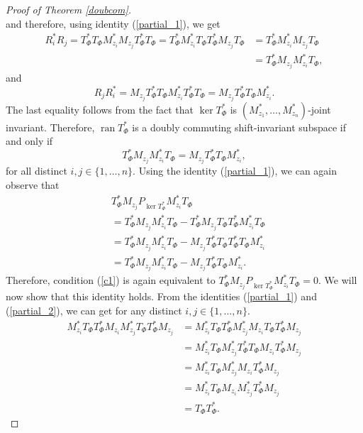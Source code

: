 \documentclass[12pt]{amsart}
\theoremstyle{definition}
\DeclareMathOperator{\ran}{ran}
\newcommand{\1}{{\mbox{\bf 1}}}
\begin{document}
\begin{proof}[Proof of Theorem \ref{doubcom}]
\begin{equation}
\end{equation}
and therefore, using identity (\ref{partial_1}), we get
\begin{align*}
R_i^* R_j = T_{\Phi}^* T_{\Phi} M_{z_i}^* M_{z_j}  T_{\Phi}^* T_{\Phi} = T_{\Phi}^* M_{z_i}^* T_{\Phi} T_{\Phi}^* M_{z_j} T_{\Phi}  &= T_{\Phi}^* M_{z_i}^* M_{z_j} T_{\Phi}  \\
&= T_{\Phi}^* M_{z_j}  M_{z_i}^*  T_{\Phi},
\end{align*}
and
\[
R_j R_i^*   = M_{z_j} T_{\Phi}^* T_{\Phi} M_{z_i}^* T_{\Phi}^* T_{\Phi} = M_{z_j} T_{\Phi}^* T_{\Phi} M_{z_i}^* .
\]
The last equality follows from the fact that $\ker T_{\Phi}^*$ is $(M_{z_1}^*, \ldots, M_{z_n}^*)$-joint invariant. Therefore, $\ran T_{\Phi}^*$ is a doubly commuting shift-invariant subspace if and only if 
\begin{equation}\label{c1}
T_{\Phi}^* M_{z_j}  M_{z_i}^*  T_{\Phi} = M_{z_j} T_{\Phi}^* T_{\Phi} M_{z_i}^*,
\end{equation}
for all distinct $i,j \in \{1,\ldots,n\}$. Using the identity (\ref{partial_1}), we can again observe that
\begin{align*}
&T_{\Phi}^* M_{z_j}  P_{\ker T_{\Phi}^*}M_{z_i}^*  T_{\Phi} \\
&= T_{\Phi}^* M_{z_j} M_{z_i}^*  T_{\Phi} - T_{\Phi}^* M_{z_j}  T_{\Phi} T_{\Phi}^* M_{z_i}^*  T_{\Phi} \\
&= T_{\Phi}^* M_{z_j} M_{z_i}^*  T_{\Phi} - M_{z_j}  T_{\Phi}^* T_{\Phi} T_{\Phi}^*T_{\Phi} M_{z_i}^*   \\
&= T_{\Phi}^* M_{z_j} M_{z_i}^*  T_{\Phi} - M_{z_j}  T_{\Phi}^* T_{\Phi} M_{z_i}^*.
\end{align*}
Therefore, condition (\ref{c1}) is again equivalent to $T_{\Phi}^* M_{z_j}  P_{\ker T_{\Phi}^*}M_{z_i}^*  T_{\Phi}=0$. We will now show that this identity holds. From the identities (\ref{partial_1}) and (\ref{partial_2}), we can get for any distinct $i,j \in \{1,\ldots,n\}$.
\begin{align*}
M_{z_i}^* T_{\Phi}  T_{\Phi}^*M_{z_i} M_{z_j}^* T_{\Phi}  T_{\Phi}^*M_{z_j} &= M_{z_i}^* T_{\Phi}  T_{\Phi}^* M_{z_j}^* M_{z_i} T_{\Phi}  T_{\Phi}^*M_{z_j} \\
&= M_{z_i}^* T_{\Phi}   M_{z_j}^* T_{\Phi}^* T_{\Phi} M_{z_i}  T_{\Phi}^*M_{z_j} \\
&= M_{z_i}^* T_{\Phi}   M_{z_j}^* M_{z_i}  T_{\Phi}^*M_{z_j} \\
&= M_{z_i}^* T_{\Phi}   M_{z_i}  M_{z_j}^*  T_{\Phi}^*M_{z_j} \\
&= T_{\Phi} T_{\Phi}^*.
\end{align*}

\end{proof}
\end{document}
